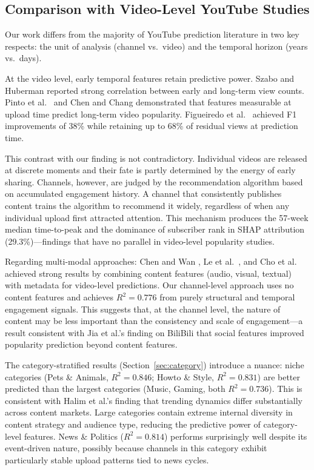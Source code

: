 \documentclass[journal,article,submit,pdftex,moreauthors]{Definitions/mdpi}
\begin{document}
\subsection{Comparison with Video-Level YouTube Studies}

Our work differs from the majority of YouTube prediction literature in
two key respects: the unit of analysis (channel vs.\ video) and the
temporal horizon (years vs.\ days).

At the video level, early temporal features retain predictive power.
Szabo and Huberman \cite{ref-szabo2010} reported strong correlation
between early and long-term view counts.
Pinto et al.\ \cite{ref-pinto2013} and Chen and Chang \cite{ref-chen2019}
demonstrated that features measurable at upload time predict long-term
video popularity.
Figueiredo et al.\ \cite{ref-figueiredo2016} achieved F1 improvements of
38\% while retaining up to 68\% of residual views at prediction time.

This contrast with our finding is not contradictory.
Individual videos are released at discrete moments and their fate is
partly determined by the energy of early sharing.
Channels, however, are judged by the recommendation algorithm based on
accumulated engagement history.
A channel that consistently publishes content trains the algorithm to
recommend it widely, regardless of when any individual upload first attracted
attention.
This mechanism produces the 57-week median time-to-peak and the dominance
of subscriber rank in SHAP attribution (29.3\%)---findings that have no
parallel in video-level popularity studies.

Regarding multi-modal approaches: Chen and Wan \cite{ref-chenwan2026},
Le et al.\ \cite{ref-le2025}, and Cho et al.\ \cite{ref-cho2024}
achieved strong results by combining content features (audio, visual,
textual) with metadata for video-level predictions.
Our channel-level approach uses no content features and achieves
$R^2 = 0.776$ from purely structural and temporal engagement signals.
This suggests that, at the channel level, the nature of content may be
less important than the consistency and scale of engagement---a result
consistent with Jia et al.'s \cite{ref-jia2018} finding on BiliBili that
social features improved popularity prediction beyond content features.

The category-stratified results (Section~\ref{sec:category}) introduce
a nuance: niche categories (Pets \& Animals, $R^2 = 0.846$; Howto \&
Style, $R^2 = 0.831$) are better predicted than the largest categories
(Music, Gaming, both $R^2 = 0.736$).
This is consistent with Halim et al.'s \cite{ref-halim2022} finding that
trending dynamics differ substantially across content markets.
Large categories contain extreme internal diversity in content strategy
and audience type, reducing the predictive power of category-level
features.
News \& Politics ($R^2 = 0.814$) performs surprisingly well despite
its event-driven nature, possibly because channels in this category
exhibit particularly stable upload patterns tied to news cycles.
\end{document}
